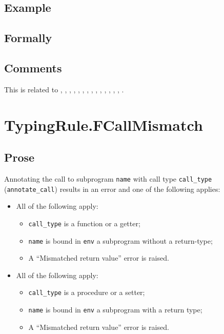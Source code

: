 \documentclass{book}
\begin{document}
\begin{itemize}
  \subsection{Example}



\begin{emptyformal}
    \subsection{Formally}
\end{emptyformal}

\subsection{Comments}
  This is related to , , ,
  , , , , ,
  , , , , ,
  , .

\section{TypingRule.FCallMismatch \label{sec:TypingRule.FCallMismatch}}

  \subsection{Prose}
  Annotating the call to subprogram \texttt{name} with call type \texttt{call\_type} \\ (\texttt{annotate\_call}) results in an error and
  one of the following applies:
  \begin{itemize}
    \item All of the following apply: \begin{itemize} \item \texttt{call\_type}
          is a function or a getter;
        \item \texttt{name} is bound in \texttt{env} a subprogram without a return-type;
        \item A ``Mismatched return value'' error is raised.
      \end{itemize}
    \item All of the following apply:
      \begin{itemize}
        \item \texttt{call\_type} is a procedure or a setter;
        \item \texttt{name} is bound in \texttt{env} a subprogram with a return type;
        \item A ``Mismatched return value'' error is raised.
      \end{itemize}
  \end{itemize}


\end{itemize}
\end{document}
